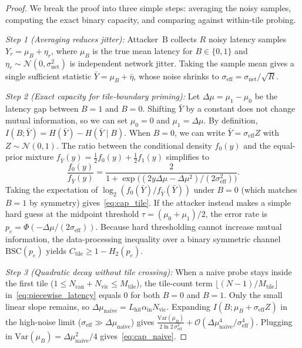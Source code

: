 \documentclass[11pt,a4paper]{article}
\renewcommand{\_}{\textunderscore\allowbreak}
\theoremstyle{definition}
\theoremstyle{remark}
\begin{document}
\begin{proof}
We break the proof into three simple steps: averaging the noisy samples, computing the exact binary capacity, and comparing against within-tile probing.

\emph{Step 1 (Averaging reduces jitter):} Attacker~B collects $R$ noisy latency samples $Y_r = \mu_B + \eta_r$, where $\mu_B$ is the true mean latency for $B \in \{0, 1\}$ and $\eta_r \sim \mathcal{N}(0, \sigma_{\mathrm{net}}^2)$ is independent network jitter. Taking the sample mean gives a single sufficient statistic $\bar{Y} = \mu_B + \bar{\eta}$, whose noise shrinks to $\sigma_{\mathrm{eff}} = \sigma_{\mathrm{net}}/\sqrt{R}$.

\emph{Step 2 (Exact capacity for tile-boundary priming):} Let $\Delta\mu = \mu_1 - \mu_0$ be the latency gap between $B=1$ and $B=0$. Shifting $\bar{Y}$ by a constant does not change mutual information, so we can set $\mu_0 = 0$ and $\mu_1 = \Delta\mu$. By definition, $I(B; \bar{Y}) = H(\bar{Y}) - H(\bar{Y} \mid B)$. When $B=0$, we can write $\bar{Y} = \sigma_{\mathrm{eff}} Z$ with $Z \sim \mathcal{N}(0,1)$. The ratio between the conditional density $f_0(y)$ and the equal-prior mixture $f_{\bar{Y}}(y) = \frac{1}{2}f_0(y) + \frac{1}{2}f_1(y)$ simplifies to
\[
  \frac{f_0(y)}{f_{\bar{Y}}(y)} = \frac{2}{1 + \exp\!\big((2 y \Delta\mu - \Delta\mu^2)/(2\sigma_{\mathrm{eff}}^2)\big)}.
\]
Taking the expectation of $\log_2(f_0(\bar{Y})/f_{\bar{Y}}(\bar{Y}))$ under $B=0$ (which matches $B=1$ by symmetry) gives~\eqref{eq:cap_tile}. If the attacker instead makes a simple hard guess at the midpoint threshold $\tau = (\mu_0 + \mu_1)/2$, the error rate is $p_e = \Phi(-\Delta\mu / (2\sigma_{\mathrm{eff}}))$. Because hard thresholding cannot increase mutual information, the data-processing inequality over a binary symmetric channel $\mathrm{BSC}(p_e)$ yields $C_{\mathrm{tile}} \ge 1 - H_2(p_e)$.

\emph{Step 3 (Quadratic decay without tile crossing):} When a naive probe stays inside the first tile ($1 \le N_{\mathrm{can}} + N_{\mathrm{vic}} \le M_{\mathrm{tile}}$), the tile-count term $\lfloor (N-1)/M_{\mathrm{tile}} \rfloor$ in~\eqref{eq:piecewise_latency} equals $0$ for both $B=0$ and $B=1$. Only the small linear slope remains, so $\Delta\mu_{\mathrm{naive}} = L_{\mathrm{hit}}\alpha_{\mathrm{in}} N_{\mathrm{vic}}$. Expanding $I(B; \mu_B + \sigma_{\mathrm{eff}} Z)$ in the high-noise limit ($\sigma_{\mathrm{eff}} \gg \Delta\mu_{\mathrm{naive}}$) gives $\frac{\mathrm{Var}(\mu_B)}{2\ln 2\,\sigma_{\mathrm{eff}}^2} + \mathcal{O}(\Delta\mu_{\mathrm{naive}}^4 / \sigma_{\mathrm{eff}}^4)$. Plugging in $\mathrm{Var}(\mu_B) = \Delta\mu_{\mathrm{naive}}^2 / 4$ gives~\eqref{eq:cap_naive}.
\end{proof}
\end{document}
